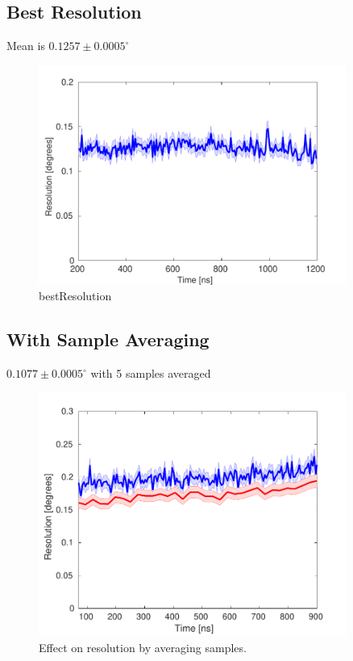 
\subsection{Best Resolution}
\label{ss:bestRes}

Mean is \(0.1257\pm0.0005^\circ\) 

\begin{figure}
  \centering
  \includegraphics[width=0.9\textwidth]{Figures/phaseMons/bestResolution}
  \caption{bestResolution}
  \label{f:bestResolution}
\end{figure}

\subsection{With Sample Averaging}
\label{ss:resCalAlongPulse}

\(0.1077\pm0.0005^\circ\) with 5 samples averaged

\begin{figure}
  \centering
  \includegraphics[width=0.9\textwidth]{Figures/phaseMons/resolutionWithAveraging}
  \caption{Effect on resolution by averaging samples.}
  \label{f:resolutionWithAveraging}
\end{figure}


